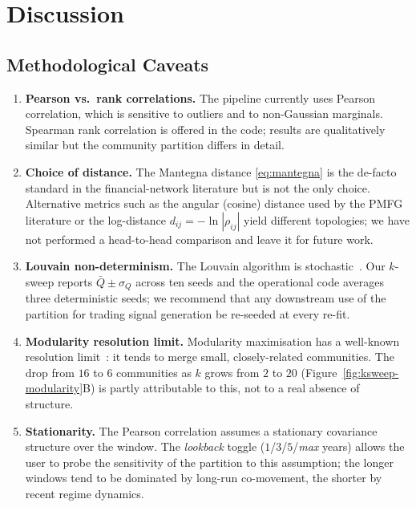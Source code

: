 \section{Discussion}
\label{sec:discussion}

\subsection{Methodological Caveats}
\label{sec:discussion-caveats}

\begin{enumerate}
  \item \textbf{Pearson vs.\ rank correlations.} The pipeline currently
  uses Pearson correlation, which is sensitive to outliers and to
  non-Gaussian marginals.  Spearman rank correlation is offered in
  the code; results are qualitatively similar but the community
  partition differs in detail.

  \item \textbf{Choice of distance.} The Mantegna distance
  \eqref{eq:mantegna} is the de-facto standard in the financial-network
  literature but is not the only choice.  Alternative metrics such as
  the angular (cosine) distance used by the PMFG literature or the
  log-distance $d_{ij}=-\ln|\rho_{ij}|$ yield different topologies;
  we have not performed a head-to-head comparison and leave it for
  future work.

  \item \textbf{Louvain non-determinism.} The Louvain algorithm is
  stochastic~\cite{blondel2008fast}.  Our $k$-sweep reports
  $\bar Q \pm \sigma_Q$ across ten seeds and the operational code
  averages three deterministic seeds; we recommend that any downstream
  use of the partition for trading signal generation be re-seeded at
  every re-fit.

  \item \textbf{Modularity resolution limit.} Modularity maximisation
  has a well-known resolution limit~\cite{fortunato2007resolution}: it
  tends to merge small, closely-related communities.  The drop from
  $16$ to $6$ communities as $k$ grows from $2$ to $20$
  (Figure~\ref{fig:ksweep-modularity}B) is partly attributable to
  this, not to a real absence of structure.

  \item \textbf{Stationarity.} The Pearson correlation assumes a
  stationary covariance structure over the window.  The
  \emph{lookback} toggle ($1$/$3$/$5$/\emph{max} years) allows the
  user to probe the sensitivity of the partition to this assumption;
  the longer windows tend to be dominated by long-run co-movement, the
  shorter by recent regime dynamics.
\end{enumerate}

